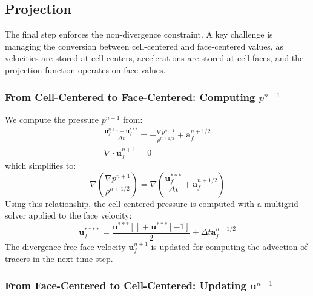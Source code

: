 \subsection{Projection}

The final step enforces the non-divergence constraint. A key challenge is managing the conversion between cell-centered and face-centered values, as velocities are stored at cell centers, accelerations are stored at cell faces, and the projection function operates on face values.  

\subsubsection{From Cell-Centered to Face-Centered: Computing $p^{n+1}$}\label{sec:centered-celltoface}  

We compute the pressure $p^{n+1}$ from:  
\begin{gather}
    \frac{\mathbf{u}_f^{n+1} - \mathbf{u}_f^{***}}{\Delta t}
  = -\frac{\nabla p^{n+1}}{\rho^{n+1/2}} + \mathbf{a}_f^{n+1/2}\\
    \nabla\cdot\mathbf{u}_f^{n+1} = 0
\end{gather}  
which simplifies to:  
\begin{equation}
    \nabla\left(\frac{\nabla p^{n+1}}{\rho^{n+1/2}}\right) = \nabla\left(\frac{\mathbf{u}_f^{***}}{\Delta t} + \mathbf{a}_f^{n+1/2}\right)
\end{equation}  
Using this relationship, the cell-centered pressure is computed with a multigrid solver applied to the face velocity:  
\begin{equation}
    \mathbf{u}_f^{****} = \frac{\mathbf{u}^{***}[] + \mathbf{u}^{***}[-1]}{2}
  + \Delta t \mathbf{a}_f^{n+1/2}
\end{equation}  
The divergence-free face velocity $\mathbf{u}_f^{n+1}$ is updated for computing the advection of tracers in the next time step.  

\subsubsection{From Face-Centered to Cell-Centered: Updating $\mathbf{u}^{n+1}$}  

